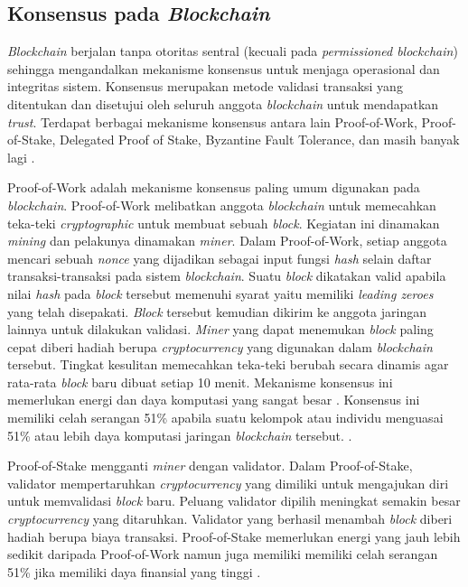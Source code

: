 \subsection{Konsensus pada \textit{Blockchain}}
\label{subsec:consensus}

\textit{Blockchain} berjalan tanpa otoritas sentral (kecuali pada \textit{permissioned blockchain}) sehingga mengandalkan mekanisme konsensus untuk menjaga operasional dan integritas sistem. Konsensus merupakan metode validasi transaksi yang ditentukan dan disetujui oleh seluruh anggota \textit{blockchain} untuk mendapatkan \textit{trust}. Terdapat berbagai mekanisme konsensus antara lain Proof-of-Work, Proof-of-Stake, Delegated Proof of Stake, Byzantine Fault Tolerance, dan masih banyak lagi \citep{Ahmed2020}. 

Proof-of-Work adalah mekanisme konsensus paling umum digunakan pada \textit{blockchain}. Proof-of-Work melibatkan anggota \textit{blockchain} untuk memecahkan teka-teki \textit{cryptographic} untuk membuat sebuah \textit{block}. Kegiatan ini dinamakan \textit{mining} dan pelakunya dinamakan \textit{miner}. Dalam Proof-of-Work, setiap anggota mencari sebuah \textit{nonce} yang dijadikan sebagai input fungsi \textit{hash} selain daftar transaksi-transaksi pada sistem \textit{blockchain}. Suatu \textit{block} dikatakan valid apabila nilai \textit{hash} pada \textit{block} tersebut memenuhi syarat yaitu memiliki \textit{leading zeroes} yang telah disepakati. \textit{Block} tersebut kemudian dikirim ke anggota jaringan lainnya untuk dilakukan validasi. \textit{Miner} yang dapat menemukan \textit{block} paling cepat diberi hadiah berupa \textit{cryptocurrency} yang digunakan dalam \textit{blockchain} tersebut. Tingkat kesulitan memecahkan teka-teki berubah secara dinamis agar rata-rata \textit{block} baru dibuat setiap 10 menit. Mekanisme konsensus ini memerlukan energi dan daya komputasi yang sangat besar . Konsensus ini memiliki celah serangan 51\% apabila suatu kelompok atau individu menguasai 51\% atau lebih daya komputasi jaringan \textit{blockchain} tersebut. \citep{Ahmed2020} \citep{Yaga2018}.

Proof-of-Stake mengganti \textit{miner} dengan validator. Dalam Proof-of-Stake, validator mempertaruhkan \textit{cryptocurrency} yang dimiliki untuk mengajukan diri untuk memvalidasi \textit{block} baru. Peluang validator dipilih meningkat semakin besar \textit{cryptocurrency} yang ditaruhkan. Validator yang berhasil menambah \textit{block} diberi hadiah berupa biaya transaksi. Proof-of-Stake memerlukan energi yang jauh lebih sedikit daripada Proof-of-Work namun juga memiliki memiliki celah serangan 51\% jika memiliki daya finansial yang tinggi \citep{Ahmed2020} \citep{Yaga2018}.

